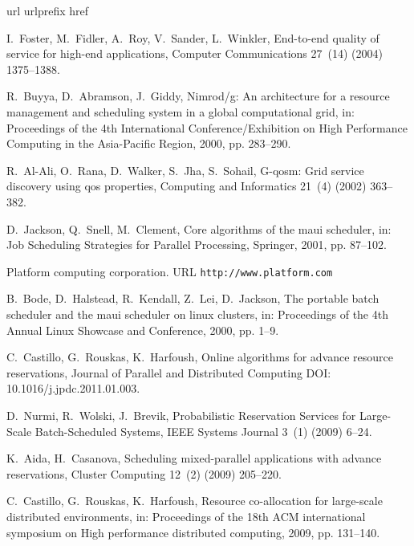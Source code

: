 \documentclass[preprint,12pt]{elsarticle}
\begin{document}
\begin{thebibliography}{10}
\expandafter\ifx\csname url\endcsname\relax
  \def\url#1{\texttt{#1}}\fi
\expandafter\ifx\csname urlprefix\endcsname\relax\def\urlprefix{URL }\fi
\expandafter\ifx\csname href\endcsname\relax
  \def\href#1#2{#2} \def\path#1{#1}\fi



I.~Foster, M.~Fidler, A.~Roy, V.~Sander, L.~Winkler, End-to-end quality of
  service for high-end applications, Computer Communications 27~(14) (2004)
  1375--1388.

R.~Buyya, D.~Abramson, J.~Giddy, Nimrod/g: An architecture for a resource
  management and scheduling system in a global computational grid, in:
  Proceedings of the 4th International Conference/Exhibition on High
  Performance Computing in the Asia-Pacific Region, 2000, pp. 283--290.

R.~Al-Ali, O.~Rana, D.~Walker, S.~Jha, S.~Sohail, G-qosm: Grid service
  discovery using qos properties, Computing and Informatics 21~(4) (2002)
  363--382.

D.~Jackson, Q.~Snell, M.~Clement, Core algorithms of the maui scheduler, in:
  Job Scheduling Strategies for Parallel Processing, Springer, 2001, pp.
  87--102.

\href{http://www.platform.com}{Platform computing corporation}.
\newline\urlprefix\url{http://www.platform.com}


B.~Bode, D.~Halstead, R.~Kendall, Z.~Lei, D.~Jackson, The portable batch
  scheduler and the maui scheduler on linux clusters, in: Proceedings of the
  4th Annual Linux Showcase and Conference, 2000, pp. 1--9.

C.~Castillo, G.~Rouskas, K.~Harfoush, {Online algorithms for advance resource
  reservations}, Journal of Parallel and Distributed Computing DOI:
  10.1016/j.jpdc.2011.01.003.

D.~Nurmi, R.~Wolski, J.~Brevik, {Probabilistic Reservation Services for
  Large-Scale Batch-Scheduled Systems}, IEEE Systems Journal 3~(1) (2009)
  6--24.

K.~Aida, H.~Casanova, {Scheduling mixed-parallel applications with advance
  reservations}, Cluster Computing 12~(2) (2009) 205--220.

C.~Castillo, G.~Rouskas, K.~Harfoush, Resource co-allocation for large-scale
  distributed environments, in: Proceedings of the 18th ACM international
  symposium on High performance distributed computing, 2009, pp. 131--140.


\end{thebibliography}
\end{document}
